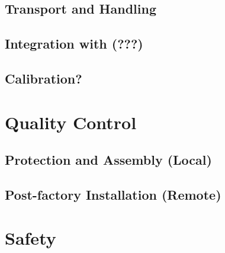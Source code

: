 \subsection{Transport and Handling}
\label{sec:fddp-tpc-elec-install-transport}


\subsection{Integration with (???)}
\label{sec:fddp-tpc-elec-install-integ}


\subsection{Calibration?}
\label{sec:fddp-tpc-elec-install-calib}



\section{Quality Control}
\label{sec:fddp-tpc-elec-qc}

\subsection{Protection and Assembly (Local)}
\label{sec:fddp-tpc-elec-qc-local}


\subsection{Post-factory Installation (Remote)}
\label{sec:fddp-tpc-elec-qc-remote}





\section{Safety}
\label{sec:fddp-tpc-elec-safety}



